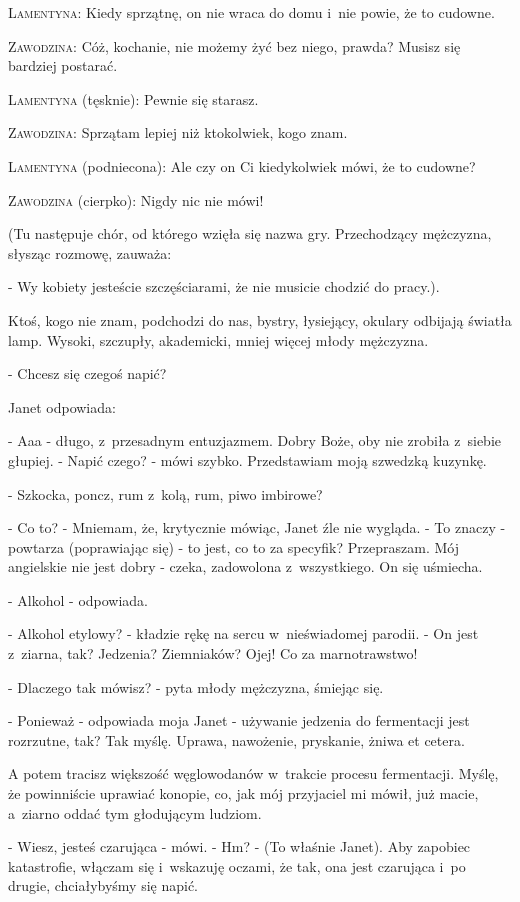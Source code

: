 \documentclass[oneside,polish,12pt,sfheadings]{mwbk}
\begin{document}
\textsc{Lamentyna}: Kiedy sprzątnę, on nie wraca do domu i~nie powie, że to
cudowne.

\textsc{Zawodzina}: Cóż, kochanie, nie możemy żyć bez niego, prawda? Musisz
się bardziej postarać.

\textsc{Lamentyna} (tęsknie): Pewnie się starasz.

\textsc{Zawodzina}: Sprzątam lepiej niż ktokolwiek, kogo znam.

\textsc{Lamentyna} (podniecona): Ale czy on Ci kiedykolwiek mówi, że to cudowne?

\textsc{Zawodzina} (cierpko): Nigdy nic nie mówi!

(Tu następuje chór, od którego wzięła się nazwa gry. Przechodzący
mężczyzna, słysząc rozmowę, zauważa: 

- Wy kobiety jesteście szczęściarami, że nie musicie chodzić do pracy.).

Ktoś, kogo nie znam, podchodzi do nas, bystry, łysiejący, okulary
odbijają światła lamp. Wysoki, szczupły, akademicki, mniej więcej
młody mężczyzna.

- Chcesz się czegoś napić?

Janet odpowiada: 

- Aaa - długo, z~przesadnym entuzjazmem. Dobry Boże,
oby nie zrobiła z~siebie głupiej. - Napić czego? - mówi szybko. Przedstawiam
moją szwedzką kuzynkę.

- Szkocka, poncz, rum z~kolą, rum, piwo imbirowe?

- Co to? - Mniemam, że, krytycznie mówiąc, Janet źle nie wygląda.
- To znaczy - powtarza (poprawiając się) - to jest, co to za specyfik?
Przepraszam. Mój angielskie nie jest dobry - czeka, zadowolona z~wszystkiego.
On się uśmiecha.

- Alkohol - odpowiada.

- Alkohol etylowy? - kładzie rękę na sercu w~nieświadomej parodii.
- On jest z~ziarna, tak? Jedzenia? Ziemniaków? Ojej! Co za marnotrawstwo!

- Dlaczego tak mówisz? - pyta młody mężczyzna, śmiejąc się.

- Ponieważ - odpowiada moja Janet - używanie jedzenia do fermentacji
jest rozrzutne, tak? Tak myślę. Uprawa, nawożenie, pryskanie, żniwa
et cetera.

A potem tracisz większość węglowodanów w~trakcie procesu fermentacji.
Myślę, że powinniście uprawiać konopie, co, jak mój przyjaciel mi
mówił, już macie, a~ziarno oddać tym głodującym ludziom.

- Wiesz, jesteś czarująca - mówi. - Hm? - (To właśnie Janet). Aby
zapobiec katastrofie, włączam się i~wskazuję oczami, że tak, ona jest
czarująca i~po drugie, chciałybyśmy się napić.
\end{document}
